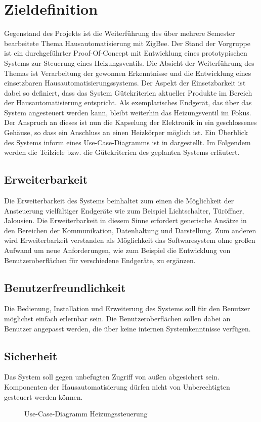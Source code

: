 \section{Zieldefinition}\label{Zieldefinition}
Gegenstand des Projekts ist die Weiterführung des über mehrere Semester bearbeitete Thema Hausautomatisierung mit ZigBee. Der Stand der Vorgruppe ist ein durchgeführter Proof-Of-Concept mit Entwicklung eines prototypischen Systems zur Steuerung eines Heizungsventils. Die Absicht der Weiterführung des Themas ist Verarbeitung der gewonnen Erkenntnisse und die Entwicklung eines einsetzbaren Hausautomatisierungssystems. Der Aspekt der Einsetzbarkeit ist dabei so definiert, dass das System Gütekriterien aktueller Produkte im Bereich der Hausautomatisierung entspricht. Als exemplarisches Endgerät, das über das System angesteuert werden kann, bleibt weiterhin das Heizungsventil im Fokus. Der Anspruch an dieses ist nun die Kapselung der Elektronik in ein geschlossenes Gehäuse, so dass ein Anschluss an einen Heizkörper möglich ist. Ein Überblick des Systems inform eines Use-Case-Diagramms ist in  dargestellt. Im Folgendem werden die Teilziele bzw. die Gütekriterien des geplanten Systems erläutert.
\subsection{Erweiterbarkeit}\label{Ziel_Erw}
Die Erweiterbarkeit des Systems beinhaltet zum einen die Möglichkeit der Ansteuerung vielfältiger Endgeräte wie zum Beispiel Lichtschalter, Türöffner, Jalousien. Die Erweiterbarkeit in diesem Sinne erfordert generische Ansätze in den Bereichen der Kommunikation, Datenhaltung und Darstellung. Zum anderen wird Erweiterbarkeit verstanden als Möglichkeit das Softwaresystem ohne großen Aufwand um neue Anforderungen, wie zum Beispiel die Entwicklung von Benutzeroberflächen für verschiedene Endgeräte, zu ergänzen.
\subsection{Benutzerfreundlichkeit}\label{Ziel_Ben}
Die Bedienung, Installation und Erweiterung des Systems soll für den Benutzer möglichst einfach erlernbar sein. Die Benutzeroberflächen sollen dabei an Benutzer angepasst werden, die über keine internen Systemkenntnisse verfügen.
\subsection{Sicherheit}\label{Ziel_Sic}
Das System soll gegen unbefugten Zugriff von außen abgesichert sein. Komponenten der Hausautomatisierung dürfen nicht von Unberechtigten gesteuert werden können.

\begin{figure}[htb]
\centering
{}
\caption{Use-Case-Diagramm Heizungssteuerung}
\label{fig:UC}
\end{figure}